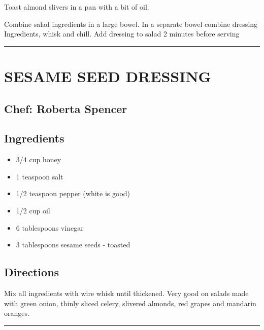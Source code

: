 \documentclass[
]{book}
\providecommand{\tightlist}{%
  \setlength{\itemsep}{0pt}\setlength{\parskip}{0pt}}
\begin{document}
Toast almond slivers in a pan with a bit of oil.

Combine salad ingredients in a large bowel. In a separate bowel combine dressing
Ingredients, whisk and chill. Add dressing to salad 2 minutes before serving

\begin{center}\rule{0.5\linewidth}{0.5pt}\end{center}

\hypertarget{sesame-seed-dressing}{%
\section*{SESAME SEED DRESSING}\label{sesame-seed-dressing}}


\hypertarget{chef-roberta-spencer-4}{%
\subsection*{Chef: Roberta Spencer}\label{chef-roberta-spencer-4}}


\hypertarget{ingredients-23}{%
\subsection*{Ingredients}\label{ingredients-23}}


\begin{itemize}
\tightlist
\item
  3/4 cup honey
\item
  1 teaspoon salt
\item
  1/2 teaspoon pepper (white is good)
\item
  1/2 cup oil
\item
  6 tablespoons vinegar
\item
  3 tablespoons sesame seeds - toasted
\end{itemize}

\hypertarget{directions-23}{%
\subsection*{Directions}\label{directions-23}}


Mix all ingredients with wire whisk until thickened. Very good on salads made with green onion,
thinly sliced celery, slivered almonds, red grapes and mandarin oranges.

\begin{center}\rule{0.5\linewidth}{0.5pt}\end{center}
\end{document}
